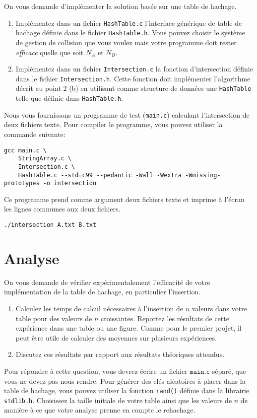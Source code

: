 \documentclass[a4paper,10pt]{article}
\begin{document}
On vous demande d'implémenter la solution basée sur une table de
hachage.

\begin{enumerate}
\item Implémentez dans un fichier \texttt{HashTable.c} l'interface générique de table de hachage définie dans le fichier \texttt{HashTable.h}.
  Vous pouvez choisir le système de gestion de collision
  que vous voulez mais votre programme doit rester {\it efficace} quelle
  que soit $N_A$ et $N_B$.
\item Implémentez dans un fichier \texttt{Intersection.c} la fonction d'intersection définie dans le fichier \texttt{Intersection.h}. Cette fonction doit implémenter l'algorithme décrit au point 2 (b) en utilisant comme structure de données une \texttt{HashTable} telle que définie dans \texttt{HashTable.h}.
\end{enumerate}

Nous vous fournissons un programme de test (\texttt{main.c}) calculant l'intersection de deux fichiers texte.
Pour compiler le programme, vous pouvez utiliser la commande suivante:

\begin{verbatim}
gcc main.c \
    StringArray.c \
    Intersection.c \
    HashTable.c --std=c99 --pedantic -Wall -Wextra -Wmissing-prototypes -o intersection
\end{verbatim}

Ce programme prend comme argument deux fichiers texte et imprime à l'écran les lignes communes aux deux fichiers.

\begin{verbatim}
./intersection A.txt B.txt
\end{verbatim}

\section{Analyse}

On vous demande de vérifier expérimentalement l'efficacité de votre
implémentation de la table de hachage, en particulier l'insertion.
\begin{enumerate}
\item Calculez les temps de calcul nécessaires à l'insertion de $n$
  valeurs dans votre table pour des valeurs de $n$
  croissantes. Reportez les résultats de cette expérience dans une
  table ou une figure. Comme pour le premier projet, il peut être
  utile de calculer des moyennes sur plusieurs expériences.
\item Discutez ces résultats par rapport aux résultats théoriques attendus.
\end{enumerate}

Pour répondre à cette question, vous devrez écrire un fichier
$\texttt{main.c}$ séparé, que vous ne devez pas nous rendre. Pour
générer des clés aléatoires à placer dans la table de hachage, vous
pouvez utiliser la fonction \texttt{rand()} définie dans la librairie \texttt{stdlib.h}. Choisissez la taille
initiale de votre table ainsi que les valeurs de $n$ de manière à ce
que votre analyse prenne en compte le rehachage.
\end{document}
